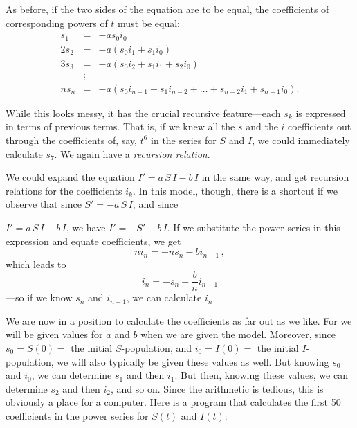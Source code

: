 {{{{As before, 
if the two sides of the equation are to be equal, the coefficients of corresponding powers of $t$ must be equal:
\begin{eqnarray*}
s_1&=&-as_0i_0 \\
2s_2&=&-a(s_0i_1+s_1i_0) \\
3s_3&=&-a(s_0i_2+s_1i_1+s_2i_0) \\
&\vdots& \\
ns_n&=&-a(s_0i_{n-1}+s_1i_{n-2}+ \ldots +s_{n-2}i_1+s_{n-1}i_0) .
\end{eqnarray*}

While this looks messy, it has the crucial recursive feature---each $s_k$ is expressed in terms of previous terms.  
That is, if we knew all the $s$ and the $i$ coefficients out through the coefficients of, say, $t^6$ in the series for $S$ and $I$, we could immediately calculate $s_7$.  We again have a {\em recursion relation}.

We could expand the equation $I'= a\, S\, I - b\, I$ in the same way, and get recursion relations for the coefficients $i_k$.  In this model, though, there is a shortcut if we observe that since $S'= -a\, S\, I$, and since 
\linebreak

\pagebreak

\noindent
$I'= a\, S\, I - b\, I$, we have $I' = -S' -b\, I$. If we substitute the power series in this expression and equate coefficients, we get
\[
ni_n = -ns_n - bi_{n-1} \, ,
\]
which leads to
\[
i_n = -s_n-\frac{b}{n}i_{n-1}
\]
---so if we know $s_n$ and $i_{n-1}$, we can calculate $i_n$.

We are now in a position to calculate the coefficients as far out as we like.  For we will be given values for $a$ and $b$ when we are given the model.  Moreover, since $s_0=S(0) = $ the initial $S$-population, and $i_0=I(0)=$ the initial $I$-population, we will also typically be given these values as well.  But knowing $s_0$ and $i_0$, we can determine $s_1$ and then $i_1$.  But then, knowing these values, we can determine $s_2$ and then $i_2$, and so on.  Since the arithmetic is tedious, this is obviously a place for a computer.  Here is a program that calculates the first 50 coefficients in the power series for $S(t)$ and $I(t)$:

}}}}
